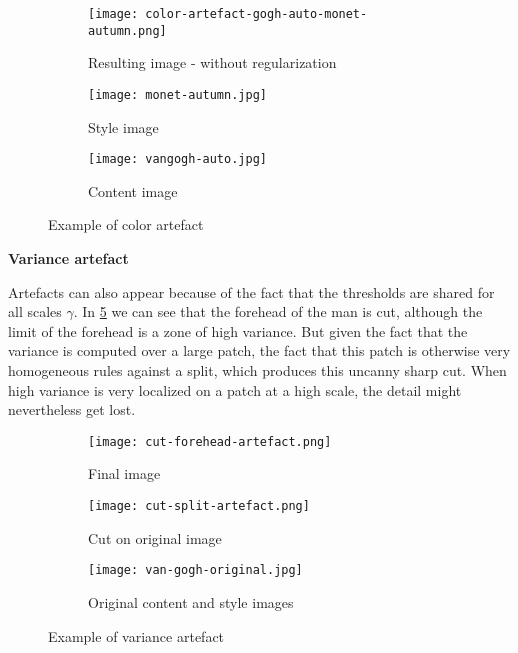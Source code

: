 \documentclass[a4paper]{article}
\begin{document}
\begin{figure}[!h]
\centering
\begin{subfigure}{.34\textwidth}
  \centering
  \texttt{[image: color-artefact-gogh-auto-monet-autumn.png]}
  \caption{\label{fig:split-house-34-2}Resulting image - without regularization}
\end{subfigure}
\begin{subfigure}{.32\textwidth}
  \centering
  \texttt{[image: monet-autumn.jpg]}
  \caption{\label{fig:monet-autumn} Style image}
\end{subfigure}
\begin{subfigure}{.32\textwidth}
  \centering
  \texttt{[image: vangogh-auto.jpg]}
  \caption{\label{fig:vangogh-auto}Content image}
\end{subfigure}
\caption{Example of color artefact}
\label{fig:color-artefact}
\end{figure}

\textbf{Variance artefact} %
\label{sub:variance_cut_artefact}

Artefacts can also appear because of the fact that the thresholds are shared for all scales $\gamma$. In \ref{fig:cut-artefact} we can see that the forehead of the man is cut, although the limit of the forehead is a zone of high variance. But given the fact that the variance is computed over a large patch, the fact that this patch is otherwise very homogeneous rules against a split, which produces this uncanny sharp cut.
When high variance is very localized on a patch at a high scale, the detail might nevertheless get lost.


\begin{figure}[!h]
\centering
\begin{subfigure}{.25\textwidth}
  \centering
  \texttt{[image: cut-forehead-artefact.png]}
  \caption{\label{fig:cut-artefact}Final image}
\end{subfigure}
\begin{subfigure}{.25\textwidth}
  \centering
  \texttt{[image: cut-split-artefact.png]}
  \caption{\label{fig:cut-split-artefact}Cut on original image}
\end{subfigure}
\begin{subfigure}{.40\textwidth}
  \centering
  \texttt{[image: van-gogh-original.jpg]}
  \caption{\label{fig:van-gogh-original}Original content and style images}
\end{subfigure}
\caption{Example of variance artefact}
\label{fig:variance-artefact}
\end{figure}
\end{document}
